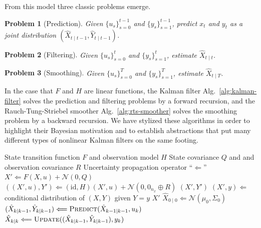 \documentclass[oneside, article]{memoir}
\newtheorem{problem}{Problem}
\begin{document}
From this model three classic problems emerge.
\begin{problem}[Prediction]\label{problem:prediction}
  Given \(\{u_s\}_{s=0}^{t-1}\) and \(\{y_s\}_{s=1}^{t-1}\), predict
  \(x_t\) and \(y_t\) as a joint distribution \((\hat X_{t \mid t-1},
  \hat Y_{t \mid t-1})\).
\end{problem}

\begin{problem}[Filtering]\label{problem:filtering}
  Given \(\{u_s\}_{s=0}^{t}\) and \(\{y_s\}_{s=1}^t\), estimate
  \(\hat X_{t \mid t}\).
\end{problem}

\begin{problem}[Smoothing]\label{problem:smoothing}
  Given \(\{u_s\}_{s=0}^T\) and \(\{y_s\}_{s=1}^T\), estimate \(\hat X_{t \mid T}\).
\end{problem}
In the case that \(F\) and \(H\) are linear functions,
the Kalman filter Alg.~\ref{alg:kalman-filter} solves the prediction
and filtering problems by a forward recursion, and the
Rauch-Tung-Striebel smoother Alg.~\ref{alg:rts-smoother} solves the
smoothing problem by a backward recursion.
We have stylized these algorithms in order to highlight their
Bayesian motivation and to establish abstractions that put many
different types of nonlinear Kalman filters on the same footing.

\begin{algorithm}
  \caption{
    \label{alg:kalman-filter}
    General Kalman algorithm for recursive \textbf{prediction} (problem
    \ref{problem:prediction}) and \textbf{filtering} (problem
  \ref{problem:filtering})}
  \begin{algorithmic}[1]
    \Require State transition function \(F\) and observation model \(H\)
    \Require State covariance \(Q\) and and observation covariance \(R\)
    \Require Uncertainty propagation operator ``\(\Longleftarrow\)''
    \State
    \(X' \Longleftarrow F(X, u) + \mathcal{N}(0, Q)\)
    \State
    \(((X', u), Y') \Longleftarrow (\text{id}, H)(X', u) +
    \mathcal{N}(0, 0_{n_x} \oplus R)\)
    \State\Return \((X', Y')\)
    \EndFunction
    \State
    \((X', y) \Longleftarrow\) conditional distribution of \((X,Y)\)
    given \(Y=y\)
    \State\Return \(X'\)
    \EndFunction
    \State \(\hat X_{0 \mid 0} \Longleftarrow \mathcal{N}(\mu_0, \Sigma_0)\)
    \State \( (\hat X_{k \mid k-1}, \hat Y_{k \mid k-1})
    \Longleftarrow \textsc{Predict}(\hat X_{k-1 \mid k-1}, u_k) \)
    \State \( \hat X_{k \mid k}  \Longleftarrow \textsc{Update}((\hat
    X_{k \mid k-1}, \hat Y_{k \mid k-1}), y_k) \)
    \EndFor
    \EndProcedure
  \end{algorithmic}
\end{algorithm}
\end{document}
